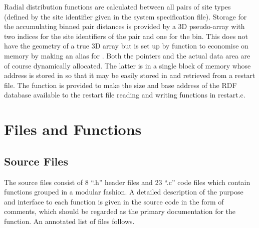 \documentclass[a4paper,twoside]{report}
\newcommand{\Fname}[1]{{\upshape\mdseries\sffamily#1}}
\begin{document}
Radial distribution functions are calculated between all pairs of site
types (defined by the site identifier given in the system
specification file).  Storage for the accumulating binned pair
distances is provided by a 3D pseudo-array 
with two indices for the site identifiers of the pair and one for the
bin.  This does not have the geometry of a true 3D array but is set up
by function  to economise on memory by making
 an alias for .
Both the pointers and the actual data area are of course dynamically
allocated.  The latter is in a single block of memory whose address is
stored in  so that it may be easily stored in and
retrieved from a restart file.  The function  is
provided to make the size and base address of the RDF database
available to the restart file reading and writing functions in
\Fname{restart.c}.


\section{Files and Functions}%

\subsection{Source Files}
The source files consist of 8 ``\Fname{.h}'' header files and 23
``\Fname{.c}'' code files which contain functions grouped in a modular
fashion.  A detailed description of the purpose and interface to each
function is given in the source code in the form of comments, which
should be regarded as the primary documentation for the function.  An
annotated list of files follows.
\end{document}
